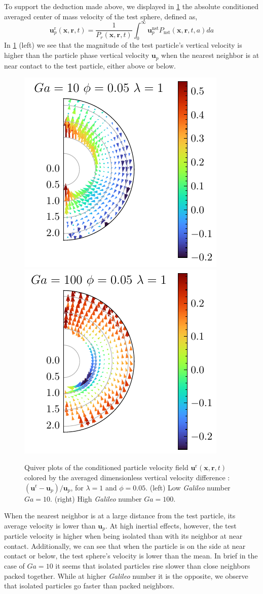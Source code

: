 To support the deduction made above, we displayed in \ref{fig:unst_ga} the absolute conditioned averaged center of mass velocity of the test sphere, defined as,
\begin{equation*}
    \textbf{u}^\text{r}_p(\textbf{x},\textbf{r},t)  
    =
    \frac{1}{P_r(\textbf{x},\textbf{r},t)}
    \int_0^\infty \textbf{u}^\text{nst}_pP_\text{nst}(\textbf{x},\textbf{r},t,a) da
\end{equation*}
In \ref{fig:unst_ga} (left) we see that the magnitude of the test particle's vertical velocity is higher than the particle phase vertical velocity $\textbf{u}_p$ when the nearest neighbor is at near contact to the test particle, either above or below.
\begin{figure}[h!]
    \centering
    \includegraphics[height=0.35\textwidth]{image/HOMOGENEOUS_NEW/Dist/U_l_1_Ga_10_PHI_5.pdf}
    \includegraphics[height=0.35\textwidth]{image/HOMOGENEOUS_NEW/Dist/U_l_1_Ga_100_PHI_5.pdf}
    \caption{
         Quiver plots of the conditioned particle velocity field $\textbf{u}^\text{r}(\textbf{x},\textbf{r},t)$ colored by the averaged dimensionless vertical velocity difference : $(\textbf{u}^\text{r} - \textbf{u}_p )/ \textbf{u}_p$, for $\lambda = 1$ and $\phi = 0.05$. 
         (left) Low \textit{Galileo} number $Ga = 10$.
        (right) High \textit{Galileo} number $Ga = 100$.
         }
    \label{fig:unst_ga}
\end{figure}
When the nearest neighbor is at a large distance from the test particle, its average velocity is lower than $\textbf{u}_p$. 
At high inertial effects, however, the test particle velocity is higher when being isolated than with its neighbor at near contact. 
Additionally, we can see that when the particle is on the side at near contact or below, the test sphere's velocity  is lower than the mean. 
In brief in the case of $Ga = 10$ it seems that isolated particles rise slower than close neighbors packed together. 
While at higher \textit{Galileo} number it is the opposite, we observe that isolated particles go faster than packed neighbors. 


